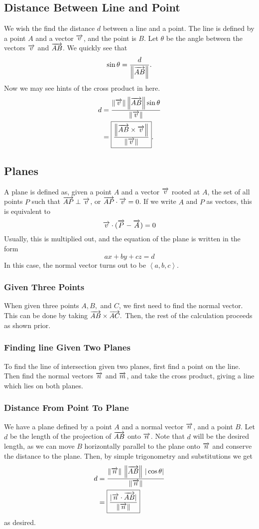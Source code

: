 \documentclass[12pt]{article}
\theoremstyle{plain} %
\theoremstyle{definition}
\theoremstyle{definition}
\theoremstyle{definition}
\theoremstyle{remark}
\newcommand{\vecv}{\vv{v}}
\newcommand{\vecn}{\vv{n}}
\newcommand{\angled}[1]{\left\langle {#1} \right\rangle}
\newcommand*{\vv}[1]{\overrightarrow{\mkern0mu#1}}
\renewcommand{\norm}[1]{\left\lVert#1\right\rVert}
\begin{document}
\subsection{Distance Between Line and Point}
We wish the find the distance $d$ between a line and a point. The line is defined by a point $A$ and a vector $\vecv$, and the point is $B$. Let $\theta$ be the angle between the vectors $\vecv$ and $\vv{AB}$. We quickly see that
\[ \sin{\theta} = \frac{d}{\norm{\vv{AB}}} .\]
Now we may see hints of the cross product in here.
\begin{align*}
    d & = \frac{\norm{\vecv}\norm{\vv{AB}}\sin{\theta}}{\norm{\vecv}} \\
     & = \boxed{\frac{\norm{\vv{AB} \times \vecv}}{\norm{\vecv}}}.
\end{align*}

\subsection{Planes}
A plane is defined as, given a point $A$ and a vector $\vecv$ rooted at $A$, the set of all points $P$ such that $\vv{AP} \perp \vecv$, or $\vv{AP} \cdot \vecv = 0$. If we write $A$  and $P$ as vectors, this is equivalent to
\[ \vecv \cdot (\vv{P} - \vv{A}) = 0 \]
Usually, this is multiplied out, and the equation of the plane is written in the form
\[ ax + by + cz = d \]
In this case, the normal vector turns out to be $\angled{a,b,c}.$

\subsubsection{Given Three Points}
When given three points $A,B,$ and $C$, we first need to find the normal vector. This can be done by taking $\vv{AB} \times \vv{AC}.$ Then, the rest of the calculation proceeds as shown prior.

\subsubsection{Finding line Given Two Planes}
To find the line of intersection given two planes, first find a point on the line. Then find the normal vectors $\vv{n}$ and $\vv{m}$, and take the cross product, giving a line which lies on both planes.

\subsubsection{Distance From Point To Plane}
We have a plane defined by a point $A$ and a normal vector $\vv{n}$, and a point $B$. Let $d$ be the length of the projection of $\vv{AB}$ onto $\vv{n}$. Note that $d$ will be the desired length, as we can move $B$ horizontally parallel to the plane onto $\vecn$ and conserve the distance to the plane. Then, by simple trigonometry and substitutions we get
\begin{align*}
d & = \frac{\norm{\vecn} \, \norm{\vv{AB}} \, |\cos{\theta}|}{\norm{\vecn}} \\
& = \boxed{\frac{|\vecn \cdot \vv{AB}|}{\norm{\vecn}}}
\end{align*}
as desired.
\end{document}
